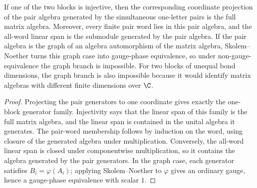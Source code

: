 \begin{lemma}
    \label{lem:pair_algebra_projection_fullness}
    \leanok
    If one of the two blocks is injective, then the corresponding coordinate
    projection of the pair algebra generated by the simultaneous one-letter
    pairs is the full matrix algebra. Moreover, every finite pair word lies in
    this pair algebra, and the all-word linear span is the submodule generated
    by the pair algebra. If the pair algebra is the graph of an algebra
    automorphism of the matrix algebra, Skolem--Noether turns this graph case
    into gauge-phase equivalence, so under non-gauge-equivalence the graph
    branch is impossible. For two blocks of unequal bond dimensions, the graph
    branch is also impossible because it would identify matrix algebras with
    different finite dimensions over $\C$.
\end{lemma}

\begin{proof}
    \leanok
    Projecting the pair generators to one coordinate gives exactly the
    one-block generator family. Injectivity says that the linear span of this
    family is the full matrix algebra, and the linear span is contained in the
    unital algebra it generates. The pair-word membership follows by induction
    on the word, using closure of the generated algebra under multiplication.
    Conversely, the all-word linear span is closed under componentwise
    multiplication, so it contains the algebra generated by the pair generators.
    In the graph case, each generator satisfies $B_i=\varphi(A_i)$; applying
    Skolem--Noether to $\varphi$ gives an ordinary gauge, hence a gauge-phase
    equivalence with scalar $1$.
\end{proof}

